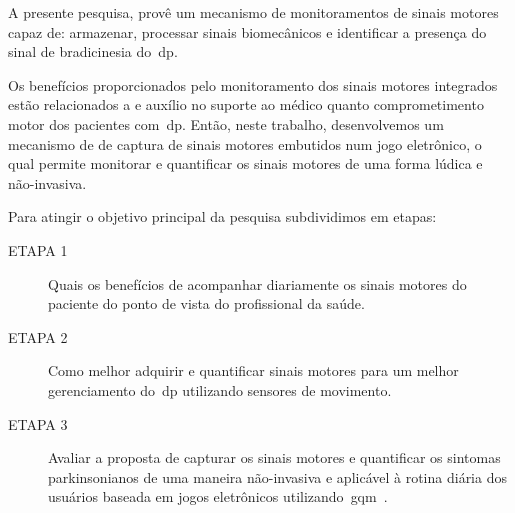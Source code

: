 A presente pesquisa, provê um mecanismo de monitoramentos de sinais motores capaz de: armazenar, processar sinais biomecânicos e identificar a presença do sinal de bradicinesia do~\ac{dp}. 




Os benefícios proporcionados pelo monitoramento dos sinais motores integrados estão relacionados a e auxílio no suporte ao médico quanto comprometimento motor dos pacientes com~\ac{dp}. Então, neste trabalho, desenvolvemos um mecanismo de de captura de sinais motores embutidos num jogo eletrônico, o qual permite monitorar e quantificar os sinais motores de uma forma lúdica e não-invasiva.

Para atingir o objetivo principal da pesquisa subdividimos em etapas:
	\begin{description}
	\item[ETAPA 1] Quais os benefícios de acompanhar diariamente os sinais motores do paciente do ponto de vista do profissional da saúde.
	\item[ETAPA 2] Como melhor adquirir e quantificar sinais motores para um melhor gerenciamento do~\ac{dp} utilizando sensores de movimento.
	\item[ETAPA 3] Avaliar a proposta de capturar os sinais motores e quantificar os sintomas parkinsonianos de uma maneira não-invasiva e aplicável à rotina diária dos usuários baseada em jogos eletrônicos utilizando~\ac{gqm}~\cite{van1999goal}.
	\end{description}


	
